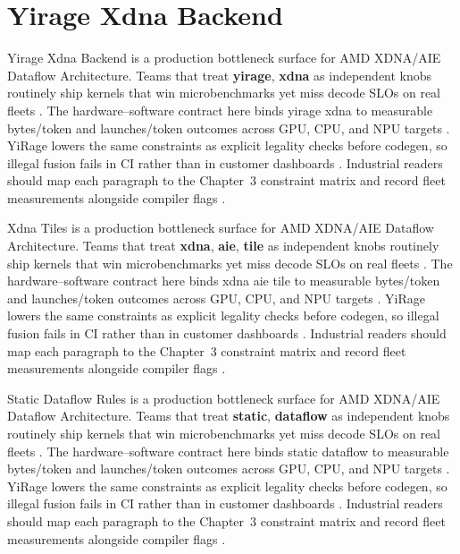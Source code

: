 \section{Yirage Xdna Backend}
\label{sec:yirage_xdna_backend}

Yirage Xdna Backend is a production bottleneck surface for AMD XDNA/AIE Dataflow Architecture. Teams that treat \textbf{yirage}, \textbf{xdna} as independent knobs routinely ship kernels that win microbenchmarks yet miss decode SLOs on real fleets \citep{amd2024aie,kwon2023vllm}. The hardware--software contract here binds yirage xdna to measurable bytes/token and launches/token outcomes across GPU, CPU, and NPU targets \citep{dlbook,nvidia2024cudagraphs}. YiRage lowers the same constraints as explicit legality checks before codegen, so illegal fusion fails in CI rather than in customer dashboards \citep{dao2022flashattention,liu2024deepseekv3}. Industrial readers should map each paragraph to the Chapter~3 constraint matrix and record fleet measurements alongside compiler flags \citep{kwon2023vllm,patel2025llminference}.

Xdna Tiles is a production bottleneck surface for AMD XDNA/AIE Dataflow Architecture. Teams that treat \textbf{xdna}, \textbf{aie}, \textbf{tile} as independent knobs routinely ship kernels that win microbenchmarks yet miss decode SLOs on real fleets \citep{semianalysis2024tma,dlbook}. The hardware--software contract here binds xdna aie tile to measurable bytes/token and launches/token outcomes across GPU, CPU, and NPU targets \citep{amd2024xdna,dao2022flashattention}. YiRage lowers the same constraints as explicit legality checks before codegen, so illegal fusion fails in CI rather than in customer dashboards \citep{amd2024aie,kwon2023vllm}. Industrial readers should map each paragraph to the Chapter~3 constraint matrix and record fleet measurements alongside compiler flags \citep{dlbook,nvidia2024cudagraphs}.

Static Dataflow Rules is a production bottleneck surface for AMD XDNA/AIE Dataflow Architecture. Teams that treat \textbf{static}, \textbf{dataflow} as independent knobs routinely ship kernels that win microbenchmarks yet miss decode SLOs on real fleets \citep{amd2024xdna,dao2022flashattention}. The hardware--software contract here binds static dataflow to measurable bytes/token and launches/token outcomes across GPU, CPU, and NPU targets \citep{amd2024aie,kwon2023vllm}. YiRage lowers the same constraints as explicit legality checks before codegen, so illegal fusion fails in CI rather than in customer dashboards \citep{dlbook,nvidia2024cudagraphs}. Industrial readers should map each paragraph to the Chapter~3 constraint matrix and record fleet measurements alongside compiler flags \citep{dao2022flashattention,liu2024deepseekv3}.


